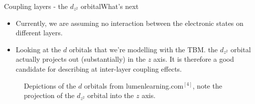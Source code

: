 \documentclass[9pt]{beamer}
\begin{document}
\begin{frame}{Coupling layers - the $d_{z^2}$ orbital}{What's next}
  \begin{itemize}
    \item Currently, we are assuming no interaction between the electronic states on different layers.

    \item Looking at the $d$ orbitals that we're modelling with the TBM. the $d_{z^2}$ orbital actually projects out (substantially) in the $z$ axis. It is therefore a good candidate for describing at inter-layer coupling effects.
  \end{itemize}

  \begin{figure}
    \centering
    \caption{Depictions of the $d$ orbitals from lumenlearning.com$^{[4]}$, note the projection of the $d_{z^2}$ orbital into the $z$ axis.}
  \end{figure}
\end{frame}
\end{document}
